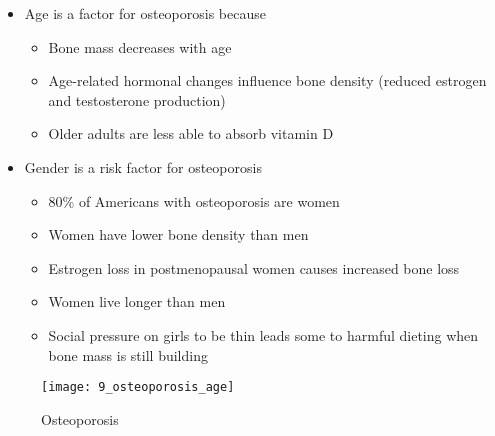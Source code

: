\documentclass[title={Chapter 9}]{fdsn201notes}
\begin{document}
\begin{itemize}
	\item Age is a factor for osteoporosis because
	\begin{itemize}
		\item Bone mass decreases with age
		\item Age-related hormonal changes influence bone density (reduced estrogen and testosterone production)
		\item Older adults are less able to absorb vitamin D
	\end{itemize}
	\item Gender is a risk factor for osteoporosis
	\begin{itemize}
		\item 80\% of Americans with osteoporosis are women
		\item Women have lower bone density than men
		\item Estrogen loss in postmenopausal women causes increased bone loss
		\item Women live longer than men
		\item Social pressure on girls to be thin leads some to harmful dieting when bone mass is still building
	\end{itemize}
\end{itemize}

\begin{figure}[H]
	\centering
	\texttt{[image: 9\_osteoporosis\_age]}
	\caption{Osteoporosis}
	\label{fig:osteoporosis-age}
\end{figure}
\end{document}
